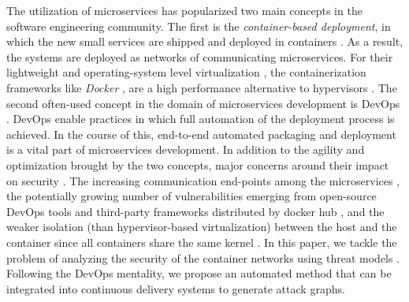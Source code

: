 The utilization of microservices has popularized two main concepts in the software engineering community. The first is the \textit{container-based deployment}, in which the new small services are shipped and deployed in containers \cite{jaramillo2016leveraging}. As a result, the systems are deployed as networks of communicating microservices. For their lightweight and operating-system level virtualization \cite{bottomely}, the containerization frameworks like \textit{Docker} \cite{cerny2018contextual}, are a high performance alternative to hypervisors \cite{kratzke2017microservices}. The second often-used concept in the domain of microservices development is DevOps \cite{cerny2018contextual}. DevOps enable practices in which full automation of the deployment process is achieved. In the course of this, end-to-end automated packaging and deployment is a vital part of microservices development. In addition to the agility and optimization brought by the two concepts, major concerns around their impact on security \cite{ahmadvand2016requirements}. The increasing communication end-points among the microservices \cite{ahmadvand2016requirements}, the potentially growing number of vulnerabilities emerging from open-source DevOps tools and third-party frameworks distributed by docker hub \cite{shu2017study,gummaraju2015over}, and the weaker isolation (than hypervisor-based virtualization) between the host and the container since all containers share the same kernel \cite{Bottomley,bui2015analysis}. In this paper, we tackle the problem of analyzing the security of the container networks using threat models \cite{kordy2014dag}. Following the DevOps mentality, we propose an automated method that can be integrated into continuous delivery systems to generate attack graphs.



